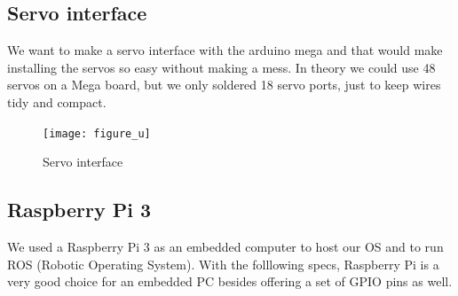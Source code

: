 \subsection{Servo interface}
We want to make a servo interface with the arduino mega and that would make installing the servos so easy without making a mess. In theory we could use 48 servos on a Mega board, but we only soldered 18 servo ports, just to keep wires tidy and compact.

\begin{figure}[H]
	\centering
	\texttt{[image: figure\_u]}
	\caption{Servo interface}
	\label{figure_u}
\end{figure}

\subsection{Raspberry Pi 3}
We used a Raspberry Pi 3 as an embedded computer to host our OS and to run ROS (Robotic Operating System). With the folllowing specs, Raspberry Pi is a very good choice for an embedded PC besides offering a set of GPIO pins as well.

